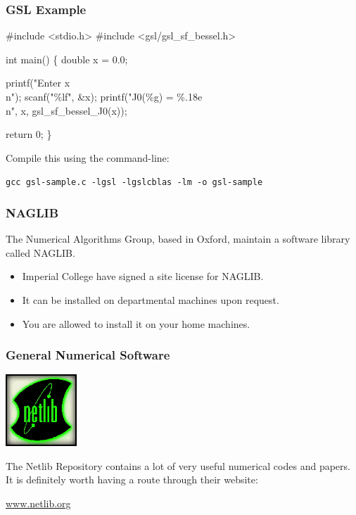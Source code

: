 \documentclass[table]{beamer}
\newif\ifschigh\schighfalse
\newcommand{\kw}[1]{\ifschigh\textcolor{red}{#1}\else\textcolor{keyword}{#1}\fi}
\newcommand{\kt}[1]{\ifschigh\textcolor{red}{#1}\else\textcolor{ctext}{#1}\fi}
\let\oldurl=\url
\renewcommand{\url}[1]{\textcolor{blue}{\oldurl{#1}}}
\begin{document}
\begin{frame}[fragile]
\frametitle{GSL Example}
\vspace{-0.2in}
\begin{semiverbatim}
\small
\kw{\#include} \kt{<stdio.h>}
\kw{\#include} \kt{<gsl/gsl_sf_bessel.h>}

\kw{int} main()
\{
   \kw{double} x = 0.0;

   printf(\kt{"Enter x \\n"});
   scanf(\kt{"\%lf"}, &x);
   printf(\kt{"J0(\%g) = \%.18e\\n"}, x, gsl_sf_bessel_J0(x));

   return 0;
\}
\end{semiverbatim}
Compile this using the command-line:
\begin{alertblock}
\tt gcc gsl-sample.c -lgsl  -lgslcblas -lm -o gsl-sample
\end{alertblock}
\end{frame}

\begin{frame}
\frametitle{NAGLIB}
The Numerical Algorithms Group, based in Oxford, maintain a software library called NAGLIB.
\begin{itemize}
\item Imperial College have signed a site license for NAGLIB.
\item It can be installed on departmental machines upon request.
\item You are allowed to install it on your home machines.
\end{itemize}
\end{frame}

\begin{frame}
\frametitle{General Numerical Software}
\begin{center}
\includegraphics[width=0.2\textwidth]{netlib.eps}
\end{center}
The Netlib Repository contains a lot of very useful numerical codes and papers. It is definitely worth having a route through their website:
\begin{center}
\url{www.netlib.org}
\end{center}
\end{frame}
\end{document}
